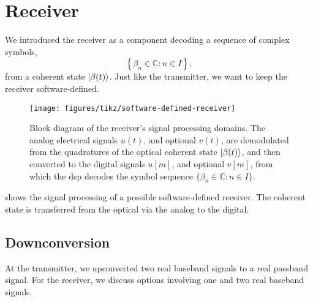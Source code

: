 \section{Receiver}
\FloatBarrier

We introduced the receiver as a component decoding a sequence of complex symbols,
\begin{equation}
	\left\{
		\beta_n
		\in
		\mathbb{C}
		\colon
		n\in I
	\right\}
	,
\end{equation}
from a coherent state $\lvert\beta(t)\rangle$.
Just like the transmitter, we want to keep the receiver software-defined.
\begin{figure}[htb]
	\centering
	\texttt{[image: figures/tikz/software-defined-receiver]}
	\caption{Block diagram of the receiver's signal processing domains. The analog electrical signals $u(t)$, and optional $v(t)$, are demodulated from the quadratures of the optical coherent state $\lvert\beta(t)\rangle$, and then converted to the digital signals $u[m]$, and optional $v[m]$, from which the \gls{dsp} decodes the symbol sequence $\{\beta_n\in\mathbb{C}\colon n\in I\}$.}\label{fig:software_defined_receiver}
\end{figure}
 shows the signal processing of a possible software-defined receiver.
The coherent state is transferred from the optical via the analog to the digital.

\FloatBarrier
\subsection{Downconversion}

At the transmitter, we upconverted two real baseband signals to a real passband signal.
For the receiver, we discuss options involving one and two real baseband signals.

